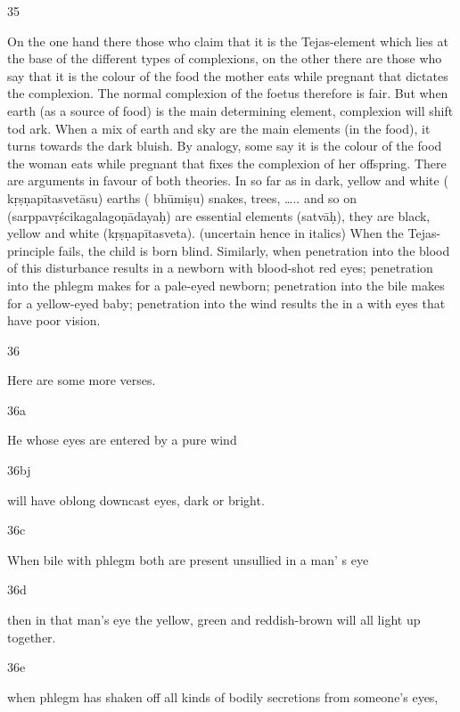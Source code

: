 \begin{translation}
\begin{tt}
\item[35]

On the one hand there those who claim that it is the Tejas-element 
  which lies at the base of the different types of complexions, on the other there 
  are those who say that it is the colour of the food the mother eats while 
  pregnant that dictates the complexion. The normal complexion of the foetus 
  therefore is fair. But when earth (as a source of food) is the main determining 
  element, complexion will shift tod ark. When a mix of earth and sky are the 
  main elements (in the food), it turns towards the dark bluish. By analogy, some 
  say it is the colour of the food the woman eats while pregnant that fixes the 
  complexion of her offspring. There are arguments in favour of both theories. 
  In so far as in dark, yellow and white ( kṛṣṇapītasvetāsu)  earths ( bhūmiṣu) 
  snakes, trees, ….. and so on (sarppavṛścikagalagoṇādayaḥ) are essential 
  elements (satvāḥ), they are black, yellow and white (kṛṣṇapītasveta). (uncertain 
  hence in italics)
  When the Tejas-principle fails, the child is born blind. Similarly, when 
  penetration into the blood of this disturbance results in a newborn with 
  blood-shot red eyes; penetration into the phlegm makes for a pale-eyed 
  newborn; penetration into the bile makes for a yellow-eyed baby; penetration 
  into the wind results  the in a with eyes that have poor vision. 
  
\item[36]

Here are some more verses.
  
\item[36a]

He whose eyes are entered by a pure wind
  
\item[36bj]

will have oblong downcast eyes, dark or bright.
  
\item[36c]

When bile with phlegm both are present unsullied in a man’ s eye 
  
\item[36d]

then in that man’s eye the yellow, green and reddish-brown will all light 
  up together. 
  
\item[36e]

when phlegm has shaken off all kinds of bodily secretions from 
  someone’s eyes,
  

\end{tt}
\end{translation}
